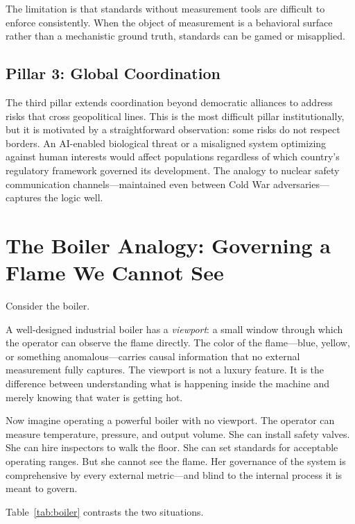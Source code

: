 \documentclass[12pt]{article}
\begin{document}
The limitation is that standards without measurement tools are difficult to
enforce consistently. When the object of measurement is a behavioral surface
rather than a mechanistic ground truth, standards can be gamed or
misapplied.

\subsection{Pillar 3: Global Coordination}

The third pillar extends coordination beyond democratic alliances to address
risks that cross geopolitical lines. This is the most difficult pillar
institutionally, but it is motivated by a straightforward observation: some
risks do not respect borders. An AI-enabled biological threat or a
misaligned system optimizing against human interests would affect populations
regardless of which country's regulatory framework governed its development.
The analogy to nuclear safety communication channels---maintained even between
Cold War adversaries---captures the logic well.

\section{The Boiler Analogy: Governing a Flame We Cannot See}
\label{sec:boiler}

Consider the boiler.

A well-designed industrial boiler has a \emph{viewport}: a small window
through which the operator can observe the flame directly. The color of the
flame---blue, yellow, or something anomalous---carries causal information
that no external measurement fully captures. The viewport is not a luxury
feature. It is the difference between understanding what is happening inside
the machine and merely knowing that water is getting hot.

Now imagine operating a powerful boiler with no viewport. The operator can
measure temperature, pressure, and output volume. She can install safety
valves. She can hire inspectors to walk the floor. She can set standards for
acceptable operating ranges. But she cannot see the flame. Her governance of
the system is comprehensive by every external metric---and blind to the
internal process it is meant to govern.

Table~\ref{tab:boiler} contrasts the two situations.
\end{document}
